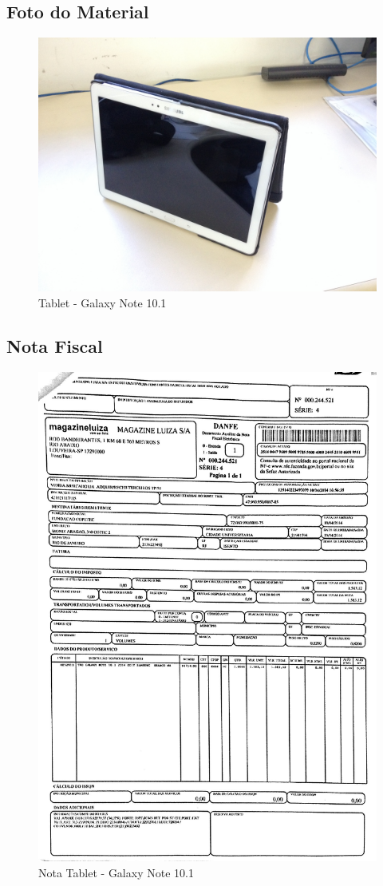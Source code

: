 \subsection{Foto do Material}
\begin{figure}[H]
 \centering
 \includegraphics[width=1\columnwidth]{Tablet/foto}
 \caption{Tablet - Galaxy Note 10.1 }
\end{figure}

\subsection{Nota Fiscal}
\begin{figure}[H]
 \centering
 \includegraphics[width=1\columnwidth]{Tablet/nota_tablet.pdf}
 \caption{Nota Tablet - Galaxy Note 10.1}
 \end{figure}
